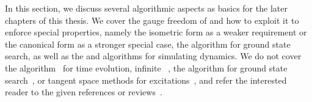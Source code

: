 In this section, we discuss several algorithmic aspects as basics for the later chapters of this thesis.
%
We cover the gauge freedom of  and how to exploit it to enforce special properties, namely the isometric form as a weaker requirement or the canonical form as a stronger special case, the  algorithm for ground state search, as well as the  and  algorithms for simulating dynamics.
%
We do not cover the  algorithm~\cite{haegeman2011a, haegeman2016a} for time evolution, infinite ~\cite{orus2008}, the  algorithm for ground state search~\cite{zauner-stauber2018a}, or tangent space methods for excitations~\cite{haegeman2013, vanderstraeten2015, vanderstraeten2019a}, and refer the interested reader to the given references or reviews~\cite{cirac2021, orus2014a}.

